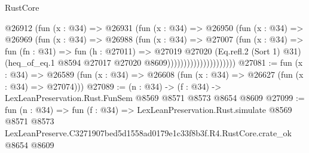 \begin{lexlean}{RustCore}
\begin{coremodule}
                              @26912
                                (fun (x : @34) =>
                                @26931
                                  (fun (x : @34) =>
                                  @26950
                                    (fun (x : @34) =>
                                    @26969
                                      (fun (x : @34) =>
                                      @26988
                                        (fun (x : @34) =>
                                        @27007
                                          (fun (x : @34) =>
                                          fun (fn : @31) =>
                                          fun (h : @27011) =>
                                          @27019
                                            @27020
                                            (Eq.refl.{2} (Sort 1) @31)
                                            (heq_of_eq.{1}
                                              @8594
                                              @27017
                                              @27020
                                              @8609)))))))))))))))))))))
@27081 := fun (x : @34) =>
  @26589 (fun (x : @34) => @26608 (fun (x : @34) => @26627 (fun (x : @34) => @27074)))
@27089 := (n : @34) -> (f : @34) -> LexLeanPreservation.Rust.FunSem @8569 @8571 @8573 @8654 @8609
@27099 := fun (n : @34) =>
  fun (f : @34) =>
  LexLeanPreservation.Rust.simulate
    @8569
    @8571
    @8573
    LexLeanPreserve.C3271907bed5d1558ad0179e1c33f8b3f.R4.RustCore.crate_ok
    @8654
    @8609
\end{coremodule}
\end{lexlean}
